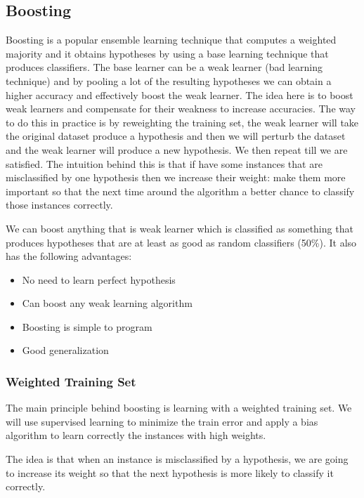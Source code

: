 \documentclass[12pt]{article}
\begin{document}
    \subsection{Boosting}
        Boosting is a popular ensemble learning technique that computes a weighted majority and it obtains hypotheses by
        using a base learning technique that produces classifiers. The base learner can be a weak learner (bad learning
        technique) and by pooling a lot of the resulting hypotheses we can obtain a higher accuracy and effectively
        boost the weak learner. The idea here is to boost weak learners and compensate for their weakness to increase
        accuracies. The way to do this in practice is by reweighting the training set, the weak learner will take the
        original dataset produce a hypothesis and then we will perturb the dataset and the weak learner will produce a
        new hypothesis. We then repeat till we are satisfied. The intuition behind this is that if have some instances
        that are misclassified by one hypothesis then we increase their weight: make them more important so that the
        next time around the algorithm a better chance to classify those instances correctly.

        We can boost anything that is weak learner which is classified as something that produces hypotheses that
        are at least as good as random classifiers (50\%). It also has the following advantages:

        \begin{itemize}
            \item No need to learn perfect hypothesis
            \item Can boost any weak learning algorithm
            \item Boosting is simple to program
            \item Good generalization
        \end{itemize}

        \subsubsection{Weighted Training Set}
            The main principle behind boosting is learning with a weighted training set. We will use supervised learning
            to minimize the train error and apply a bias algorithm to learn correctly the instances with high weights.

            The idea is that when an instance is misclassified by a hypothesis, we are going to increase its weight so
            that the next hypothesis is more likely to classify it correctly.
\end{document}
